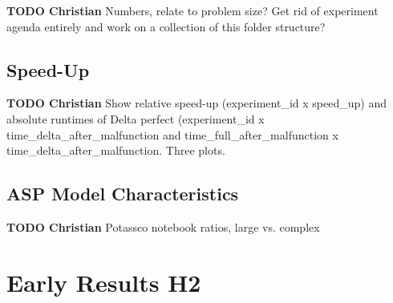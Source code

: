 \documentclass{article}
\begin{document}
\begin{mdframed}
{\bf TODO Christian} Numbers, relate to problem size? Get rid of experiment agenda entirely and work on a collection of this folder structure?
\end{mdframed}



\subsection{Speed-Up}

\begin{mdframed}
{\bf TODO Christian} Show relative speed-up (experiment_id x speed_up) and absolute runtimes of Delta perfect (experiment_id x time_delta_after_malfunction and time_full_after_malfunction x time_delta_after_malfunction. Three plots.
\end{mdframed}




\subsection{ASP Model Characteristics}

\begin{mdframed}
{\bf TODO Christian} Potassco notebook ratios, large vs. complex
\end{mdframed}


\section{Early Results H2}





\end{document}
